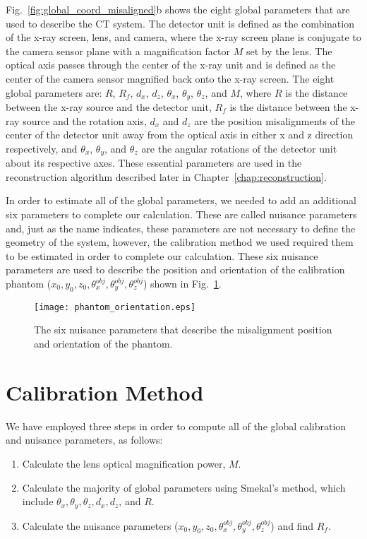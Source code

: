 Fig.~\ref{fig:global_coord_misaligned}b shows the eight global parameters that are used to describe the CT system.  The detector unit is defined as the combination of the x-ray screen, lens, and camera, where the x-ray screen plane is conjugate to the camera sensor plane with a magnification factor $M$ set by the lens.  The optical axis passes through the center of the x-ray unit and is defined as the center of the camera sensor magnified back onto the x-ray screen.  The eight global parameters are: $R$, $R_f$, $d_x$, $d_z$, $\theta_x$, $\theta_y$, $\theta_z$, and $M$, where $R$ is the distance between the x-ray source and the detector unit, $R_f$ is the distance between the x-ray source and the rotation axis, $d_x$ and $d_z$ are the position misalignments of the center of the detector unit away from the optical axis in either x and z direction respectively, and $\theta_x$, $\theta_y$, and $\theta_z$ are the angular rotations of the detector unit about its respective axes.  These essential parameters are used in the reconstruction algorithm described later in Chapter~\ref{chap:reconstruction}.

In order to estimate all of the global parameters, we needed to add an additional six parameters to complete our calculation.  These are called nuisance parameters and, just as the name indicates, these parameters are not necessary to define the geometry of the system, however, the calibration method we used required them to be estimated in order to complete our calculation.  These six nuisance parameters are used to describe the position and orientation of the calibration phantom ($x_0, y_0, z_0, \theta^{obj}_x, \theta_y^{obj}, \theta_z^{obj}$) shown in Fig.~\ref{fig:phantom_orientation}.  

\begin{figure}[ht]
\centering
\texttt{[image: phantom\_orientation.eps]}
\caption{The six nuisance parameters that describe the misalignment position and orientation of the phantom.}
\label{fig:phantom_orientation}
\end{figure}

\section{Calibration Method}
\label{section:calibration_method}
We have employed three steps in order to compute all of the global calibration and nuisance parameters, as follows:

\begin{enumerate}
\item Calculate the lens optical magnification power, $M$.
\item Calculate the majority of global parameters using Smekal's method, which include $\theta_x, \theta_y, \theta_z, d_x, d_z$, and $R$.
\item Calculate the nuisance parameters ($x_0, y_0, z_0, \theta^{obj}_x, \theta^{obj}_y, \theta^{obj}_z$) and find $R_f$.
\end{enumerate}

